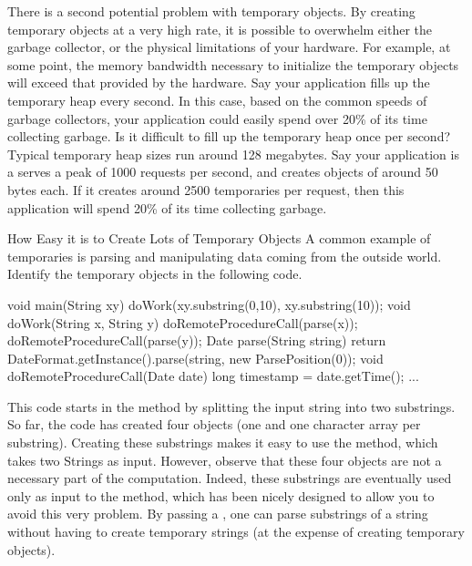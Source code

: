 There is a second potential problem with temporary objects. By creating temporary
objects at a very high rate, it is possible to overwhelm either the garbage
collector, or the physical limitations of your hardware. For example, at some
point, the memory bandwidth necessary to initialize the temporary objects will
exceed that provided by the hardware. Say your application fills up the temporary
heap every second. In this case, based on the common speeds of garbage
collectors, your application could easily
 spend over 20\% of its time collecting garbage. Is it difficult to fill up the
 temporary heap once per second? Typical temporary heap sizes run around 128
 megabytes. Say your application is a serves a peak of 1000 requests per second,
 and creates objects of around 50 bytes each. If it creates around 2500
 temporaries per request, then this application will spend 20\% of its time
 collecting garbage.



\begin{example}{How Easy it is to Create Lots of Temporary Objects}
A common example of temporaries is parsing
and manipulating data coming from the outside world. Identify the temporary
objects in the following code.

\begin{shortlisting}%
void main(String xy) {
	doWork(xy.substring(0,10), xy.substring(10));
}	
void doWork(String x, String y) {
	doRemoteProcedureCall(parse(x));
	doRemoteProcedureCall(parse(y));
}
Date parse(String string) {
	return DateFormat.getInstance().parse(string, new ParsePosition(0));
}
void doRemoteProcedureCall(Date date) {
	long timestamp = date.getTime();
	...
}
\end{shortlisting}
\end{example} 

This code starts in the  method by splitting the input string into two
substrings. So far, the code has created four objects (one  and one
character array per substring). Creating these substrings makes it easy to use
the  method, which takes two Strings as input. However, observe that
these four objects are not a necessary part of the computation. Indeed, these
substrings are eventually used only as input to the 
 method, which has been nicely designed to allow you to avoid this
very problem. By passing a , one can parse substrings of a
string without having to create temporary strings (at the expense of creating
temporary  objects).




